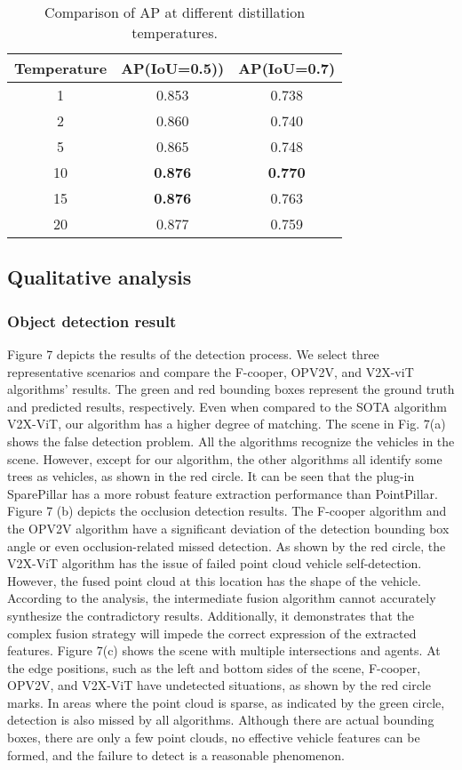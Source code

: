 \documentclass[lettersize,journal]{IEEEtran}
\begin{document}
\begin{table}
\renewcommand\arraystretch{1.5}
\tabcolsep=0.5cm
\centering
\caption{Comparison of AP at different distillation temperatures.}
\label{tab3}
\begin{tabular}{ c c c } \hline
Temperature & AP(IoU=0.5)) & AP(IoU=0.7)\\ \hline
1 & 0.853 & 0.738\\
2 & 0.860 & 0.740\\
5 & 0.865 & 0.748\\
10 & \textbf{0.876} & \textbf{0.770}\\
15 & \textbf{0.876} & 0.763\\
20 & 0.877 & 0.759\\ \hline
\end{tabular}
\end{table}






\subsection{Qualitative analysis}
\subsubsection{Object detection result}
Figure 7 depicts the results of the detection process. We select three representative scenarios and compare the F-cooper, OPV2V, and V2X-viT algorithms' results. The green and red bounding boxes represent the ground truth and predicted results, respectively. Even when compared to the SOTA algorithm V2X-ViT, our algorithm has a higher degree of matching. The scene in Fig. 7(a) shows the false detection problem. All the algorithms recognize the vehicles in the scene. However, except for our algorithm, the other algorithms all identify some trees as vehicles, as shown in the red circle. It can be seen that the plug-in SparePillar has a more robust feature extraction performance than PointPillar. Figure 7 (b) depicts the occlusion detection results. The F-cooper algorithm and the OPV2V algorithm have a significant deviation of the detection bounding box angle or even occlusion-related missed detection. As shown by the red circle, the V2X-ViT algorithm has the issue of failed point cloud vehicle self-detection. However, the fused point cloud at this location has the shape of the vehicle. According to the analysis, the intermediate fusion algorithm cannot accurately synthesize the contradictory results. Additionally, it demonstrates that the complex fusion strategy will impede the correct expression of the extracted features. Figure 7(c) shows the scene with multiple intersections and agents. At the edge positions, such as the left and bottom sides of the scene, F-cooper, OPV2V, and V2X-ViT have undetected situations, as shown by the red circle marks. In areas where the point cloud is sparse, as indicated by the green circle, detection is also missed by all algorithms. Although there are actual bounding boxes, there are only a few point clouds, no effective vehicle features can be formed, and the failure to detect is a reasonable phenomenon.
\end{document}
